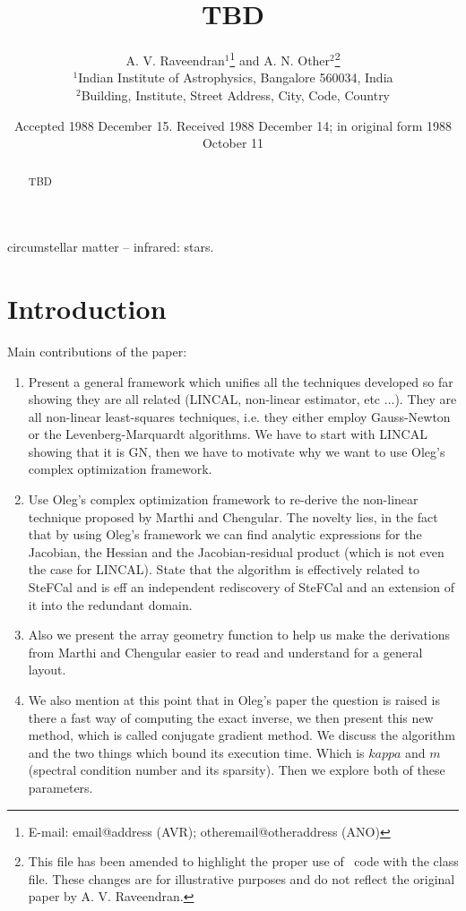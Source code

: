 \documentclass[useAMS,usenatbib]{mn2e}
\title[Unknown]{TBD}
\author[A. V. Raveendran and A. N. Other]{A. V. Raveendran$^{1}$\thanks{E-mail:
email@address (AVR); otheremail@otheraddress (ANO)} and A. N.
Other$^{2}$\footnotemark[1]\thanks{This file has been amended to
highlight the proper use of \LaTeXe\ code with the class file.
These changes are for illustrative purposes and do not reflect the
original paper by A. V. Raveendran.}\\
$^{1}$Indian Institute of Astrophysics, Bangalore 560034, India\\
$^{2}$Building, Institute, Street Address, City, Code, Country}
\begin{document}
\date{Accepted 1988 December 15. Received 1988 December 14; in original form 1988 October 11}

\pagerange{\pageref{firstpage}--\pageref{lastpage}} 

\maketitle

\label{firstpage}

\begin{abstract}
TBD
\end{abstract}

\begin{keywords}
circumstellar matter -- infrared: stars.
\end{keywords}

\section{Introduction}

Main contributions of the paper:

\begin{enumerate}
 \item Present a general framework which unifies all the techniques developed so far showing they are all related (LINCAL, non-linear estimator, etc ...). They are all non-linear
 least-squares techniques, i.e. they either employ Gauss-Newton or the Levenberg-Marquardt algorithms. We have to start with LINCAL showing that it is GN, then we have to motivate 
 why we want to use Oleg's complex optimization framework.
 \item Use Oleg's complex optimization framework to re-derive the non-linear technique proposed by Marthi and Chengular. The novelty lies, in the fact that by using Oleg's
 framework we can find analytic expressions for the Jacobian, the Hessian and the Jacobian-residual product (which is not even the case for LINCAL). State that the algorithm is 
 effectively related to SteFCal and is eff an independent rediscovery of SteFCal and an extension of it into the redundant domain.
 \item Also we present the array geometry function to help us make the derivations from Marthi and Chengular easier to read and understand for a general layout.
 \item We also mention at this point that in Oleg's paper the question is raised is there a fast way of computing the exact inverse, we then present this new method, which is called
 conjugate gradient method. We discuss the algorithm and the two things which bound its execution time. Which is $kappa$ and $m$ (spectral condition number and its sparsity). Then
 we explore both of these parameters.
 \end{enumerate}
 
\end{document}
